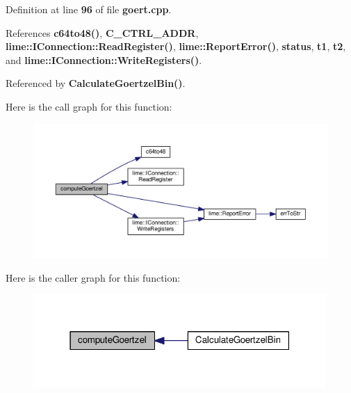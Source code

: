 Definition at line {\bf 96} of file {\bf goert.\+cpp}.



References {\bf c64to48()}, {\bf C\+\_\+\+C\+T\+R\+L\+\_\+\+A\+D\+DR}, {\bf lime\+::\+I\+Connection\+::\+Read\+Register()}, {\bf lime\+::\+Report\+Error()}, {\bf status}, {\bf t1}, {\bf t2}, and {\bf lime\+::\+I\+Connection\+::\+Write\+Registers()}.



Referenced by {\bf Calculate\+Goertzel\+Bin()}.



Here is the call graph for this function\+:
\nopagebreak
\begin{figure}[H]
\begin{center}
\leavevmode
\includegraphics[width=350pt]{de/dc9/goert_8cpp_a3b4bbb3ef316422c243fcdc5887c8ec7_cgraph}
\end{center}
\end{figure}




Here is the caller graph for this function\+:
\nopagebreak
\begin{figure}[H]
\begin{center}
\leavevmode
\includegraphics[width=316pt]{de/dc9/goert_8cpp_a3b4bbb3ef316422c243fcdc5887c8ec7_icgraph}
\end{center}
\end{figure}



